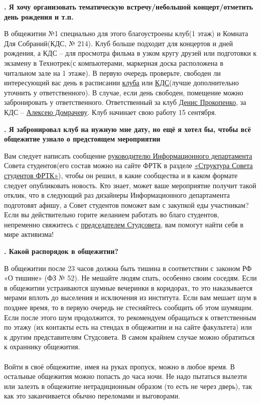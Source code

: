 \documentclass[14pt]{extarticle}
\newcounter{question}
\newcommand\Que[1]{%
    \begin{minipage}{\textwidth}
    \leavevmode\par
    \stepcounter{question}
    \noindent
    {\large\textbf{\thequestion. #1}}\par}
\newcommand\Ans[2][]{%
    \leavevmode\par\noindent
    {\leftskip37pt
    \textbf{#1}#2\par}
    \end{minipage}}
\begin{document}
\Que{Я хочу организовать тематическую встречу/небольшой концерт/отметить день рождения и т.п.}
\Ans{В общежитии №1 специально для этого благоустроены клуб(1 этаж) и Комната Для Собраний(КДС, № 214). Клуб больше подходит для концертов и дней рождения, а КДС -- для просмотра фильма в узком кругу друзей или подготовки к экзамену в Технотрек(с компьютерами, маркерная доска расположена в читальном зале на 1 этаже). В первую очередь проверьте, свободен ли интересующий вас день в расписании \href{https://calendar.google.com/calendar/embed?src=ffse5gki3k4f9j266789sbj5ns@group.calendar.google.com&ctz=Europe/Moscow}{клуба} или \href{https://frtk.mipt.ru/services/meeting/}{КДС}(лучше дополнительно уточнить у ответственного). В случае, если день свободен, помещение можно забронировать у ответственного. Ответственный за клуб \href{https://vk.com/denproc}{Денис Прокопенко}, за КДС -- \href{https://vk.com/domrachev_alexey}{Алексею Домрачеву}. Клуб начинает свою работу 15 сентября.}

\Que{Я забронировал клуб на нужную мне дату, но ещё я хотел бы, чтобы всё общежитие узнало о предстоящем мероприятии}
\Ans{Вам следует написать сообщение \href{https://vk.com/danya_goes_ahead}{руководителю Информационного департамента} Совета студентов(его состав можно на сайте ФРТК в разделе \href{https://mipt.ru/drec/forstudents/studsovet/structure.php}{«Структура Совета студентов ФРТК»}), чтобы он решил, в какие сообщества и в каком формате следует опубликовать новость. Кто знает, может ваше мероприятие получит такой отклик, что в следующий раз дизайнеры Информационного департамента подготовят афишу, а Совет студентов поможет вам с закупкой еды участникам? Если вы действительно горите желанием работать во благо студентов, непременно свяжитесь с \href{https://vk.com/philalala}{председателем Студсовета}, вам помогут найти себя в мире активизма!}

\Que{Какой распорядок в общежитии?}
\Ans{В общежитии после 23 часов должна быть тишина в соответствии с законом РФ «О тишине» (ФЗ № 52). Не мешайте людям спать, особенно своим соседям. Если в общежитии устраиваются шумные вечеринки в коридорах, то это наказывается мерами вплоть до выселения и исключения из института. Если вам мешает шум в позднее время, то в первую очередь не стесняйтесь сообщить об этом шумящим. Если после этого шум продолжится, то рекомендуем обращаться к ответственным по этажу (их контакты есть на стендах в общежитии и на сайте факультета) или к другим представителям Студсовета. В самом крайнем случае можно обратиться к охраннику общежития. \\ \\ Войти в своё общежитие, имея на руках пропуск, можно в любое время. В остальные общежития можно попасть до часа ночи. Не надо пытаться вылезти или залезть в общежитие нетрадиционным образом (то есть не через дверь), так как это заканчивается обычно переломами и выговорами.}
\end{document}
